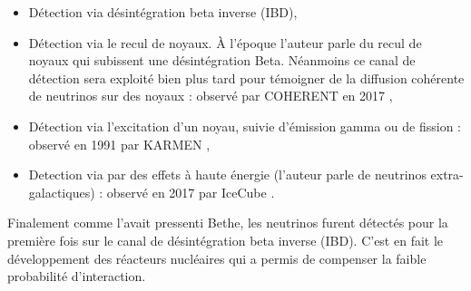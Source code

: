 \begin{itemize}[label=$\bullet$]
    \item Détection via désintégration beta inverse (IBD),
    \item Détection via le recul de noyaux. À l'époque l'auteur parle du recul de noyaux qui subissent une désintégration Beta. Néanmoins ce canal de détection sera exploité bien plus tard pour témoigner de la diffusion cohérente de neutrinos sur des noyaux : observé par COHERENT en 2017 \cite{Scholberg:2018vwg},
    \item Détection via l'excitation d'un noyau, suivie d'émission gamma ou de fission : observé en 1991 par KARMEN \cite{Drexlin:1991gx},
    \item Detection via par des \og effets \fg{} à haute énergie (l'auteur parle de neutrinos extra-galactiques) : observé en 2017 par IceCube \cite{Padovani:2018acg}.
\end{itemize}

\bigbreak


Finalement comme l'avait pressenti Bethe, les neutrinos furent détectés pour la première fois sur le canal de désintégration beta inverse (IBD). C'est en fait le développement des réacteurs nucléaires qui a permis de compenser la faible probabilité d'interaction.

\bigbreak

